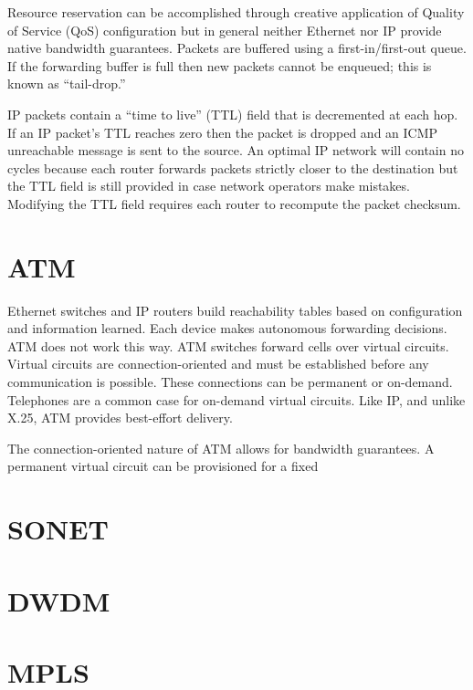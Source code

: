 \documentclass{book}
\begin{document}
Resource reservation can be accomplished through creative application of Quality of Service (QoS) configuration but in general neither Ethernet nor IP provide native bandwidth guarantees. Packets are buffered using a first-in/first-out queue. If the forwarding buffer is full then new packets cannot be enqueued; this is known as ``tail-drop.''

IP packets contain a ``time to live'' (TTL) field that is decremented at each hop. If an IP packet's TTL reaches zero then the packet is dropped and an ICMP unreachable message is sent to the source. An optimal IP network will contain no cycles because each router forwards packets strictly closer to the destination but the TTL field is still provided in case network operators make mistakes. Modifying the TTL field requires each router to recompute the packet checksum.

\section{ATM}

Ethernet switches and IP routers build reachability tables based on configuration and information learned. Each device makes autonomous forwarding decisions. ATM does not work this way. ATM switches forward cells over virtual circuits. Virtual circuits are connection-oriented and must be established before any communication is possible. These connections can be permanent or on-demand. Telephones are a common case for on-demand virtual circuits. Like IP, and unlike X.25, ATM provides best-effort delivery.

The connection-oriented nature of ATM allows for bandwidth guarantees. A permanent virtual circuit can be provisioned for a fixed 

\section{SONET}

\section{DWDM}

\section{MPLS}




\end{document}
